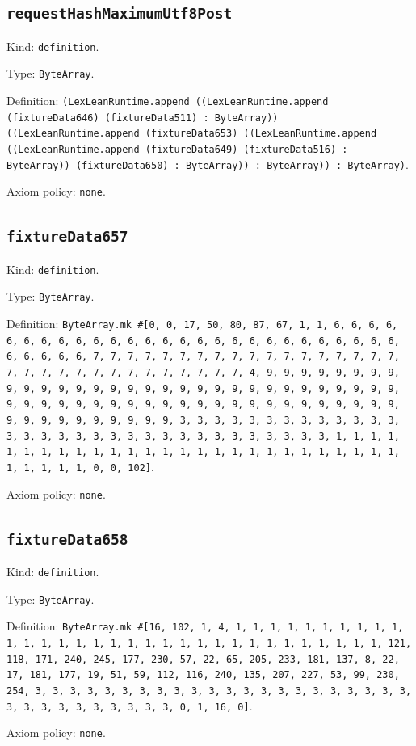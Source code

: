 \documentclass[11pt]{article}
\begin{document}
\subsection*{\texttt{requestHashMaximumUtf8Post}}
\noindent Kind: \texttt{definition}.\par
\noindent Type: \texttt{ByteArray}.\par
\noindent Definition: \texttt{(LexLeanRuntime.append ((LexLeanRuntime.append (fixtureData646) (fixtureData511) : ByteArray)) ((LexLeanRuntime.append (fixtureData653) ((LexLeanRuntime.append ((LexLeanRuntime.append (fixtureData649) (fixtureData516) : ByteArray)) (fixtureData650) : ByteArray)) : ByteArray)) : ByteArray)}.\par
\noindent Axiom policy: \texttt{none}.\par
\subsection*{\texttt{fixtureData657}}
\noindent Kind: \texttt{definition}.\par
\noindent Type: \texttt{ByteArray}.\par
\noindent Definition: \texttt{ByteArray.mk \#[0, 0, 17, 50, 80, 87, 67, 1, 1, 6, 6, 6, 6, 6, 6, 6, 6, 6, 6, 6, 6, 6, 6, 6, 6, 6, 6, 6, 6, 6, 6, 6, 6, 6, 6, 6, 6, 6, 6, 6, 6, 7, 7, 7, 7, 7, 7, 7, 7, 7, 7, 7, 7, 7, 7, 7, 7, 7, 7, 7, 7, 7, 7, 7, 7, 7, 7, 7, 7, 7, 7, 7, 7, 4, 9, 9, 9, 9, 9, 9, 9, 9, 9, 9, 9, 9, 9, 9, 9, 9, 9, 9, 9, 9, 9, 9, 9, 9, 9, 9, 9, 9, 9, 9, 9, 9, 9, 9, 9, 9, 9, 9, 9, 9, 9, 9, 9, 9, 9, 9, 9, 9, 9, 9, 9, 9, 9, 9, 9, 9, 9, 9, 9, 9, 9, 9, 9, 9, 3, 3, 3, 3, 3, 3, 3, 3, 3, 3, 3, 3, 3, 3, 3, 3, 3, 3, 3, 3, 3, 3, 3, 3, 3, 3, 3, 3, 3, 3, 3, 3, 1, 1, 1, 1, 1, 1, 1, 1, 1, 1, 1, 1, 1, 1, 1, 1, 1, 1, 1, 1, 1, 1, 1, 1, 1, 1, 1, 1, 1, 1, 1, 1, 0, 0, 102]}.\par
\noindent Axiom policy: \texttt{none}.\par
\subsection*{\texttt{fixtureData658}}
\noindent Kind: \texttt{definition}.\par
\noindent Type: \texttt{ByteArray}.\par
\noindent Definition: \texttt{ByteArray.mk \#[16, 102, 1, 4, 1, 1, 1, 1, 1, 1, 1, 1, 1, 1, 1, 1, 1, 1, 1, 1, 1, 1, 1, 1, 1, 1, 1, 1, 1, 1, 1, 1, 1, 1, 1, 1, 121, 118, 171, 240, 245, 177, 230, 57, 22, 65, 205, 233, 181, 137, 8, 22, 17, 181, 177, 19, 51, 59, 112, 116, 240, 135, 207, 227, 53, 99, 230, 254, 3, 3, 3, 3, 3, 3, 3, 3, 3, 3, 3, 3, 3, 3, 3, 3, 3, 3, 3, 3, 3, 3, 3, 3, 3, 3, 3, 3, 3, 3, 3, 3, 0, 1, 16, 0]}.\par
\noindent Axiom policy: \texttt{none}.\par
\end{document}
